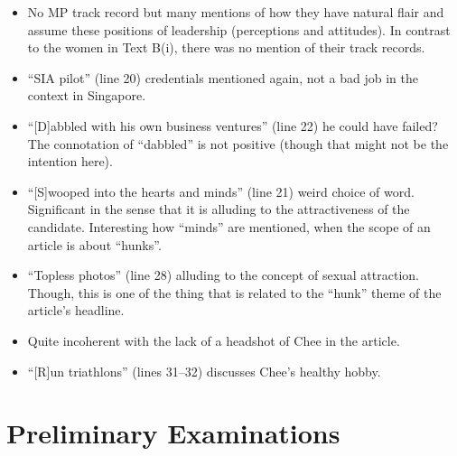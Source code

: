 \documentclass[../main.tex]{subfiles}
\begin{document}
\begin{itemize}
\begin{itemize}
						\item No MP track record but many mentions of how they have natural flair and assume these positions of leadership (perceptions and attitudes). In contrast to the women in Text B(i), there was no mention of their track records.
						\item ``SIA pilot'' (line 20) credentials mentioned again, not a bad job in the context in Singapore. 
						\item ``[D]abbled with his own business ventures'' (line 22) he could have failed? The connotation of ``dabbled'' is not positive (though that might not be the intention here).
						\item ``[S]wooped into the hearts and minds'' (line 21) weird choice of word. Significant in the sense that it is alluding to the attractiveness of the candidate. Interesting how ``minds'' are mentioned, when the scope of an article is about ``hunks''.
						\item ``Topless photos'' (line 28) alluding to the concept of sexual attraction. Though, this is one of the thing that is related to the ``hunk'' theme of the article's headline.
						\item Quite incoherent with the lack of a headshot of Chee in the article.
						\item ``[R]un triathlons'' (lines 31--32) discusses Chee's healthy hobby.
					\end{itemize}
				\end{itemize}

		\section*{Preliminary Examinations}
\end{document}

